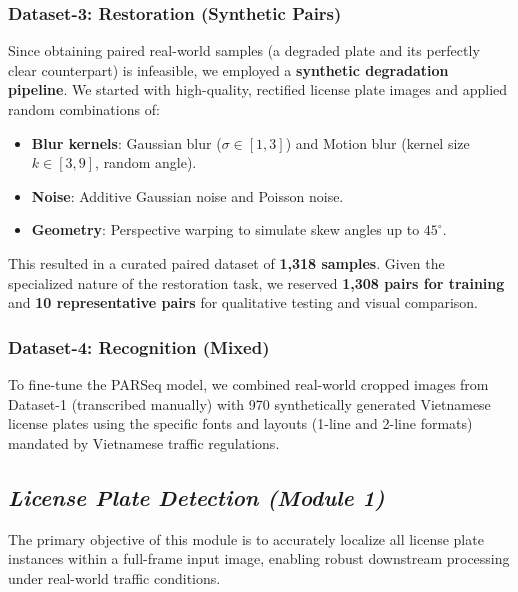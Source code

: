 \documentclass[a4paper,11pt,twocolumn]{article}
\begin{document}
	\subsubsection{Dataset-3: Restoration (Synthetic Pairs)}
	Since obtaining paired real-world samples (a degraded plate and its perfectly clear counterpart) is infeasible, we employed a \textbf{synthetic degradation pipeline}. We started with high-quality, rectified license plate images and applied random combinations of:
	\begin{itemize}
		\item \textbf{Blur kernels}: Gaussian blur ($\sigma \in [1, 3]$) and Motion blur (kernel size $k \in [3, 9]$, random angle).
		\item \textbf{Noise}: Additive Gaussian noise and Poisson noise.
		\item \textbf{Geometry}: Perspective warping to simulate skew angles up to $45^\circ$.
	\end{itemize}
	This resulted in a curated paired dataset of \textbf{1,318 samples}. Given the specialized nature of the restoration task, we reserved \textbf{1,308 pairs for training} and \textbf{10 representative pairs} for qualitative testing and visual comparison.
	
	\subsubsection{Dataset-4: Recognition (Mixed)}
	To fine-tune the PARSeq model, we combined real-world cropped images from Dataset-1 (transcribed manually) with 970 synthetically generated Vietnamese license plates using the specific fonts and layouts (1-line and 2-line formats) mandated by Vietnamese traffic regulations.
	
	\subsection{\textit{License Plate Detection (Module 1)}}
	
	The primary objective of this module is to accurately localize all license plate instances within a full-frame input image, enabling robust downstream processing under real-world traffic conditions.
	
\end{document}
